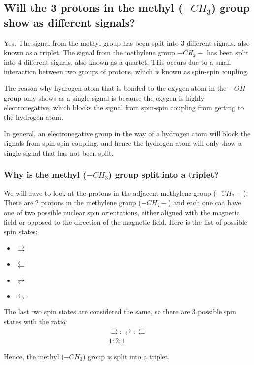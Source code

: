 \documentclass[11pt]{article}
\begin{document}
\newpage
\subsection{Will the 3 protons in the methyl (\(-CH_3\)) group show as different signals?}
\label{sec:orge748343}
Yes. The signal from the methyl group has been split into 3 different signals, also known as a triplet. The signal from the methylene group \(-CH_2-\) has been split into 4 different signals, also known as a quartet. This occurs due to a small interaction between two groups of protons, which is known as spin-spin coupling.


The reason why hydrogen atom that is bonded to the oxygen atom in the \(-OH\) group only shows as a single signal is because the oxygen is highly electronegative, which blocks the signal from spin-spin coupling from getting to the hydrogen atom.

In general, an electronegative group in the way of a hydrogen atom will block the signals from spin-spin coupling, and hence the hydrogen atom will only show a single signal that has not been split.
\subsubsection{Why is the methyl (\(-CH_3\)) group split into a triplet?}
\label{sec:org030eb4c}
We will have to look at the protons in the adjacent methylene group (\(-CH_2-\)). There are 2 protons in the methylene group (\(-CH_2-\)) and each one can have one of two possible nuclear spin orientations, either aligned with the magnetic field or opposed to the direction of the magnetic field. Here is the list of possible spin states:
\begin{itemize}
\item \(\rightrightarrows\)
\item \(\leftleftarrows\)
\item \(\rightleftarrows\)
\item \(\leftrightarrows\)
\end{itemize}

The last two spin states are considered the same, so there are 3 possible spin states with the ratio:
\begin{align*}
\rightrightarrows : \rightleftarrows : \leftleftarrows \\ 1 : 2 : 1
\end{align*}

Hence, the methyl (\(-CH_3\)) group is split into a triplet.
\end{document}
